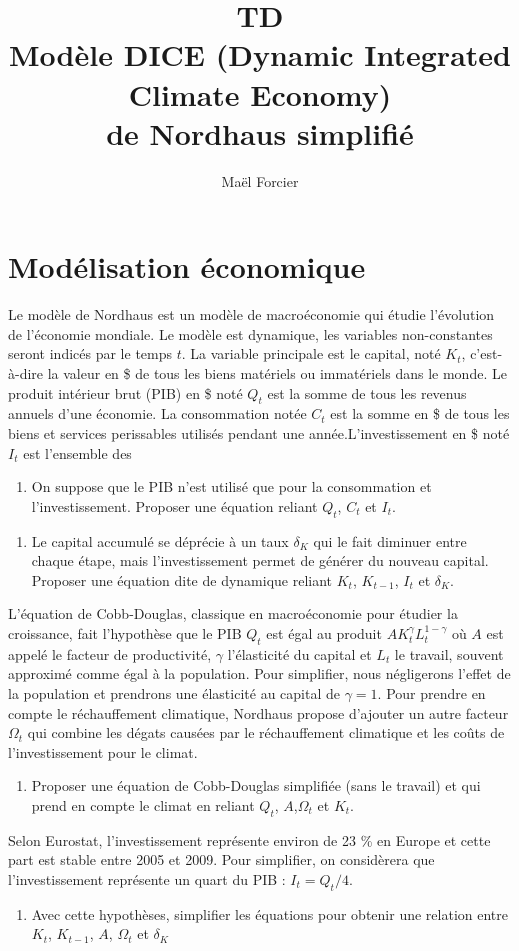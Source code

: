 \documentclass[12pt]{article}
\title{TD \\Modèle 
DICE (Dynamic Integrated Climate Economy) \\
de Nordhaus simplifié }
\author{Maël Forcier}
\newcommand{\ques}[1]{\begin{enumerate}[resume]
\item  #1
\end{enumerate}}
\newcommand{\rep}[1]{\textit{Réponse :} #1 }
\renewcommand{\rep}[1]{ }
\theoremstyle{remark}
\begin{document}
\maketitle


\section{Modélisation économique}

Le modèle de Nordhaus est un modèle de macroéconomie qui étudie l'évolution de l'économie mondiale. Le modèle est dynamique, les variables non-constantes seront indicés par le temps $t$. La variable principale est le capital, noté $K_t$, c'est-à-dire la valeur en \$ de tous les biens matériels ou immatériels dans le monde. Le produit intérieur brut (PIB) en \$ noté $Q_t$ est la somme de tous les revenus annuels d'une économie. La consommation notée $C_t$ est la somme en \$ de tous les biens et services perissables utilisés pendant une année.L'investissement en \$ noté $I_t$ est l'ensemble des 

\begin{enumerate}
\item On suppose que le PIB n'est utilisé que pour la consommation et l'investissement. Proposer une équation reliant $Q_t$, $C_t$ et $I_t$.
\end{enumerate}
\rep{ $Q_{t}=C_t + I_t$ }
\begin{enumerate}[resume]
\item  Le capital accumulé se déprécie à un taux $\delta_K$ qui le fait diminuer entre chaque étape, mais l'investissement permet de générer du nouveau capital. Proposer une équation dite de dynamique reliant $K_{t}$, $K_{t-1}$, $I_t$ et $\delta_K$.
\end{enumerate}
\rep{ $K_{t}=(1-\delta_K)K_{t-1}+I_t$ }

L'équation de Cobb-Douglas, classique en macroéconomie pour étudier la croissance, fait l'hypothèse que le PIB $Q_t$ est égal au produit $AK_t^\gamma L_t^{1-\gamma}$ où $A$ est appelé le facteur de productivité, $\gamma$ l'élasticité du capital et $L_t$ le travail, souvent approximé comme égal à la population. Pour simplifier, nous négligerons l'effet de la population et prendrons une élasticité au capital de $\gamma=1$. Pour prendre en compte le réchauffement climatique, Nordhaus propose d'ajouter un autre facteur $\Omega_t$ qui combine les dégats causées par le réchauffement climatique et les coûts  de l'investissement pour le climat. 
\ques{  Proposer une équation de Cobb-Douglas simplifiée (sans le travail) et qui prend en compte le climat en reliant $Q_{t}$, $A$,$\Omega_t$ et $K_{t}$.
}
\rep{ $Q_{t}=A \Omega_t K_t$}
Selon Eurostat, l'investissement représente environ de 23 \% en Europe et cette part est stable entre 2005 et 2009. Pour simplifier, on considèrera que l'investissement représente un quart du PIB : $I_t=Q_t/4$.
\ques{Avec cette hypothèses, simplifier les équations pour obtenir une relation entre $K_t$, $K_{t-1}$, $A$, $\Omega_t$ et $\delta_K$}
\rep{\begin{equation*} K_t=\frac{1- \delta_K}{1- \frac{A\Omega_t}{4}} \end{equation*}}
\end{document}

